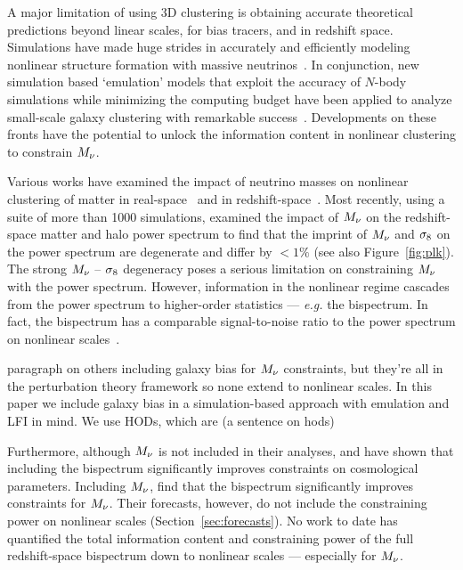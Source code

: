 A major limitation of using 3D clustering is obtaining accurate theoretical 
predictions beyond linear scales, for bias tracers, and in redshift space. 
Simulations have made huge strides in accurately and efficiently modeling 
nonlinear structure formation with massive neutrinos~\citep[\emph{e.g.}][]{brandbyge2008, 
villaescusa-navarro2013, castorina2015, adamek2017, emberson2017, villaescusa-navarro2018}. 
In conjunction, new simulation based `emulation' models that exploit the 
accuracy of $N$-body simulations while minimizing the computing budget 
have been applied to analyze small-scale galaxy clustering with remarkable 
success~\citep[\emph{e.g.}][]{heitmann2009, kwan2015, euclidcollaboration2018, mcclintock2018, zhai2018, wibking2019}. 
Developments on these fronts have the potential to unlock the information 
content in nonlinear clustering to constrain $M_\nu$. 

Various works have examined the impact of neutrino masses on nonlinear clustering 
of matter in 
real-space~\citep[\emph{e.g.}][]{brandbyge2008, saito2008, wong2008, saito2009, viel2010, agarwal2011, bird2012, castorina2015, banerjee2016} 
and in redshift-space~\citep{marulli2011, castorina2015, upadhye2016}. Most recently, 
using a suite of more than 1000 simulations, \cite{villaescusa-navarro2018} 
examined the impact of $M_\nu$ on the redshift-space matter and halo power 
spectrum to find that the imprint of $M_\nu$ and $\sigma_8$ on the power spectrum are 
degenerate and differ by $< 1\%$ (see also Figure~\ref{fig:plk}). The strong $M_\nu$ -- $\sigma_8$ degeneracy
poses a serious limitation on constraining $M_\nu$ with the power spectrum. 
However, information in the nonlinear regime cascades from the power spectrum 
to higher-order statistics --- \emph{e.g.} the bispectrum. 
In fact, the 
bispectrum has a comparable signal-to-noise ratio to the power spectrum
on nonlinear scales~\citep{sefusatti2005, chan2017}.  


paragraph on others including galaxy bias for $M_\nu$ constraints, but they're all in the 
perturbation theory framework so none extend to nonlinear scales. In this paper we include galaxy 
bias in a simulation-based approach with emulation and LFI in mind. We use HODs, which are 
(a sentence on hods) 

Furthermore, although $M_\nu$ 
is not included in their analyses, \cite{sefusatti2006} and \cite{yankelevich2019} 
have shown that including the bispectrum significantly improves constraints on 
cosmological parameters.
Including $M_\nu$, \cite{chudaykin2019} find that the bispectrum significantly 
improves constraints for $M_\nu$. Their forecasts, however, do not include the 
constraining power on nonlinear scales (Section~\ref{sec:forecasts}). 
No work to date has quantified the total information content and constraining 
power of the full redshift-space bispectrum down to nonlinear scales --- especially for $M_\nu$. 

